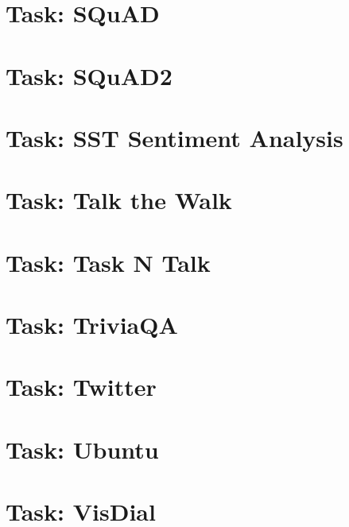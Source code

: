 \documentclass[twoside]{book}
\newcommand{\+}{\discretionary{\mbox{\scriptsize$\hookleftarrow$}}{}{}}
\begin{document}
\chapter{Task\+: S\+Qu\+AD}
\label{md_parlai_tasks_squad_README}

\chapter{Task\+: S\+Qu\+A\+D2}
\label{md_parlai_tasks_squad2_README}

\chapter{Task\+: S\+ST Sentiment Analysis}
\label{md_parlai_tasks_sst_README}

\chapter{Task\+: Talk the Walk}
\label{md_parlai_tasks_talkthewalk_README}

\chapter{Task\+: Task N\textquotesingle{} Talk}
\label{md_parlai_tasks_taskntalk_README}

\chapter{Task\+: Trivia\+QA}
\label{md_parlai_tasks_triviaqa_README}

\chapter{Task\+: Twitter}
\label{md_parlai_tasks_twitter_README}

\chapter{Task\+: Ubuntu}
\label{md_parlai_tasks_ubuntu_README}

\chapter{Task\+: Vis\+Dial}
\label{md_parlai_tasks_visdial_README}

\end{document}
